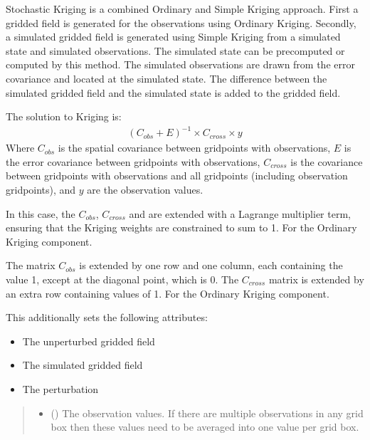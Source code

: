 \documentclass[letterpaper,10pt,english]{sphinxmanual}
\begin{document}
\begin{fulllineitems}
\begin{fulllineitems}
\sphinxAtStartPar
Stochastic Kriging is a combined Ordinary and Simple Kriging approach.
First a gridded field is generated for the observations using Ordinary
Kriging. Secondly, a simulated gridded field is generated using Simple
Kriging from a simulated state and simulated observations. The simulated
state can be pre\sphinxhyphen{}computed or computed by this method. The simulated
observations are drawn from the error covariance and located at the
simulated state. The difference between the simulated gridded field and
the simulated state is added to the gridded field.

\sphinxAtStartPar
The solution to Kriging is:
\begin{equation*}
\begin{split}(C_{obs} + E)^{-1} \times C_{cross} \times y\end{split}
\end{equation*}
\sphinxAtStartPar
Where \(C_{obs}\) is the spatial covariance between grid\sphinxhyphen{}points
with observations, \(E\) is the error covariance between grid\sphinxhyphen{}points
with observations, \(C_{cross}\) is the covariance between
grid\sphinxhyphen{}points with observations and all grid\sphinxhyphen{}points (including observation
grid\sphinxhyphen{}points), and \(y\) are the observation values.

\sphinxAtStartPar
In this case, the \(C_{obs}\), \(C_{cross}\) and are extended
with a Lagrange multiplier term, ensuring that the Kriging weights are
constrained to sum to 1. For the Ordinary Kriging component.

\sphinxAtStartPar
The matrix \(C_{obs}\) is extended by one row and one column, each
containing the value 1, except at the diagonal point, which is 0. The
\(C_{cross}\) matrix is extended by an extra row containing values
of 1. For the Ordinary Kriging component.

\sphinxAtStartPar
This additionally sets the following attributes:
\begin{itemize}
\item {}
\sphinxAtStartPar
{} \sphinxhyphen{} The unperturbed gridded field

\item {}
\sphinxAtStartPar
{} \sphinxhyphen{} The simulated gridded field

\item {}
\sphinxAtStartPar
{} \sphinxhyphen{} The perturbation

\end{itemize}
\begin{quote}\begin{description}
\begin{itemize}
\item {}
\sphinxAtStartPar
{} () \textendash{} The observation values. If there are multiple observations in any
grid box then these values need to be averaged into one value per
grid box.


\end{itemize}
\end{description}
\end{quote}
\end{fulllineitems}
\end{fulllineitems}
\end{document}
